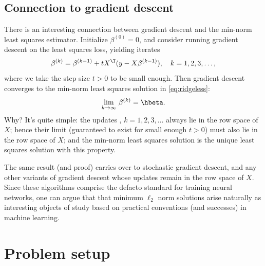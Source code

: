 \documentclass{article}
\begin{document}
\subsection{Connection to gradient descent}

There is an interesting connection between gradient descent and the min-norm
least squares estimator. Initialize $\beta^{(0)} = 0$, and consider running
gradient descent on the least squares loss, yielding iterates
\[
\beta^{(k)} = \beta^{(k-1)} + t X^\T (y-X\beta^{(k-1)}), 
\quad k=1,2,3,\dots,
\]
where we take the step size $t>0$ to be small enough. Then gradient descent
converges to the min-norm least squares solution in \eqref{eq:ridgeless}: 
\[
\lim_{k \to \infty} \, \beta^{(k)} = \hbeta.
\]
Why? It's quite simple: the updates , $k=1,2,3,\dots$
always lie in the row space of $X$; hence their limit (guaranteed to exist for
small enough $t>0$) must also lie in the row space of $X$; and the min-norm
least squares solution is the unique least squares solution with this property.    

The same result (and proof) carries over to stochastic gradient descent, and any 
other variants of gradient descent whose updates remain in the row space of $X$.  
Since these algorithms comprise the defacto standard for training neural
networks, one can argue that that minimum $\ell_2$ norm solutions arise
naturally as interesting objects of study based on practical conventions (and
successes) in machine learning.  

\section{Problem setup}

\def\asto{\overset{\mathrm{as}}{\to}}
\def\dto{\overset{d}{\to}}
\def\Risk{\mathrm{Risk}}
\def\hSigma{\hat\Sigma}
\def\SNR{\mathrm{SNR}}
\end{document}
